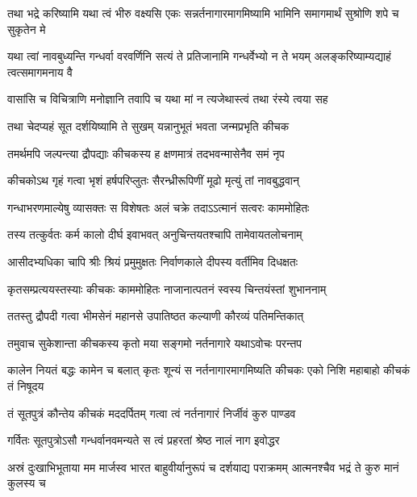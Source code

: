 


\threelineshloka
{तथा भद्रे करिष्यामि यथा त्वं भीरु वक्ष्यसि}
{एकः सन्नर्तनागारमागमिष्यामि भामिनि}
{समागमार्थं सुश्रोणि शपे च सुकृतेन मे}


\threelineshloka
{यथा त्वां नावबुध्यन्ति गन्धर्वा वरवर्णिनि}
{सत्यं ते प्रतिजानामि गन्धर्वेभ्यो न ते भयम्}
{अलङ्करिष्याम्यद्याहं त्वत्समागमनाय वै}


\twolineshloka
{वासांसि च विचित्राणि मनोज्ञानि तवापि च}
{यथा मां न त्यजेथास्त्वं तथा रंस्ये त्वया सह}




\twolineshloka
{तथा चेदप्यहं सूत दर्शयिष्यामि ते सुखम्}
{यन्नानुभूतं भवता जन्मप्रभृति कीचक}



\twolineshloka
{तमर्थमपि जल्पन्त्या द्रौपद्याः कीचकस्य ह}
{क्षणमात्रं तदभवन्मासेनैव समं नृप}


\twolineshloka
{कीचकोऽथ गृहं गत्वा भृशं हर्षपरिप्लुतः}
{सैरन्ध्रीरूपिणीं मूढो मृत्युं तां नावबुद्धवान्}


\twolineshloka
{गन्धाभरणमाल्येषु व्यासक्तः स विशेषतः}
{अलं चक्रे तदाऽऽत्मानं सत्वरः काममोहितः}


\twolineshloka
{तस्य तत्कुर्वतः कर्म कालो दीर्घ इवाभवत्}
{अनुचिन्तयतश्चापि तामेवायतलोचनाम्}


\twolineshloka
{आसीदभ्यधिका चापि श्रीः श्रियं प्रमुमुक्षतः}
{निर्वाणकाले दीपस्य वर्तीमिव दिधक्षतः}


\twolineshloka
{कृतसम्प्रत्ययस्तस्याः कीचकः काममोहितः}
{नाजानात्पतनं स्वस्य चिन्तयंस्तां शुभाननाम्}


\twolineshloka
{ततस्तु द्रौपदी गत्वा भीमसेनं महानसे}
{उपातिष्ठत कल्याणी कौरव्यं पतिमन्तिकात्}


\twolineshloka
{तमुवाच सुकेशान्ता कीचकस्य कृतो मया}
{सङ्गमो नर्तनागारे यथाऽवोचः परन्तप}


\threelineshloka
{कालेन नियतं बद्धः कामेन च बलात् कृतः}
{शून्यं स नर्तनागारमागमिष्यति कीचकः}
{एको निशि महाबाहो कीचकं तं निषूदय}


\twolineshloka
{तं सूतपुत्रं कौन्तेय कीचकं मददर्पितम्}
{गत्वा त्वं नर्तनागारं निर्जीवं कुरु पाण्डव}


\twolineshloka
{गर्वितः सूतपुत्रोऽसौ गन्धर्वानवमन्यते}
{स त्वं प्रहरतां श्रेष्ठ नालं नाग इवोद्धर}


\threelineshloka
{अस्रं दुःखाभिभूताया मम मार्जस्व भारत}
{बाहुवीर्यानुरूपं च दर्शयाद्य पराक्रमम्}
{आत्मनश्चैव भद्रं ते कुरु मानं कुलस्य च}

